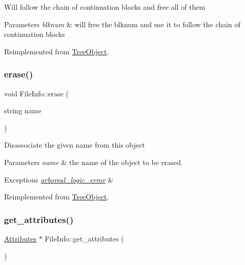 Will follow the chain of continuation blocks and free all of them 
\begin{DoxyParams}{Parameters}
{\em blknum} & will free the blknum and use it to follow the chain of continuation blocks \\
\hline
\end{DoxyParams}


Reimplemented from \mbox{\hyperlink{class_tree_object_a07f5f5de1cff0cfdc2372e81559f5181}{Tree\+Object}}.

\mbox{\label{class_file_info_ae058242283d3317eaf2b79428e6137f6}} 
\subsubsection{\texorpdfstring{erase()}{erase()}}
{\footnotesize\ttfamily void File\+Info\+::erase (\begin{DoxyParamCaption}\item[{string}]{name }\end{DoxyParamCaption})\hspace{0.3cm}{\ttfamily [virtual]}}

Disassociate the given name from this object 
\begin{DoxyParams}{Parameters}
{\em name} & the name of the object to be erased. \\
\hline
\end{DoxyParams}

\begin{DoxyExceptions}{Exceptions}
{\em \mbox{\hyperlink{classarboreal__logic__error}{arboreal\+\_\+logic\+\_\+error}}} & \\
\hline
\end{DoxyExceptions}


Reimplemented from \mbox{\hyperlink{class_tree_object_a453b5df2a9ef7c6faad259900d574ee2}{Tree\+Object}}.

\mbox{\label{class_file_info_a07f09582ef3c3beb105906d5c71234a5}} 
\subsubsection{\texorpdfstring{get\+\_\+attributes()}{get\_attributes()}}
{\footnotesize\ttfamily \mbox{\hyperlink{class_attributes}{Attributes}} $\ast$ File\+Info\+::get\+\_\+attributes (\begin{DoxyParamCaption}{ }\end{DoxyParamCaption})}

